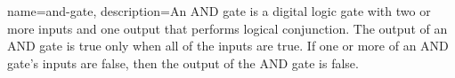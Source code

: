 {
    name=and-gate,
    description={An AND gate is a digital logic gate with two or more inputs and one output that performs logical conjunction. The output of an AND gate is true only when all of the inputs are true. If one or more of an AND gate's inputs are false, then the output of the AND gate is false.}
}
